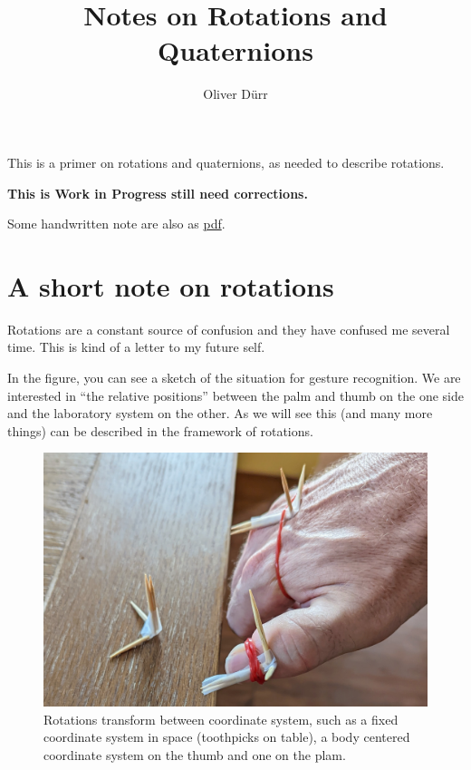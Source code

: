 \documentclass[
  letterpaper,
  DIV=11,
  numbers=noendperiod]{scrartcl}
\title{Notes on Rotations and Quaternions}
\author{Oliver Dürr}
\date{}
\renewcommand*\contentsname{Table of contents}
\newcommand\contentsname{Table of contents}
\begin{document}
\maketitle
\ifdefined\Shaded\renewenvironment{Shaded}{\begin{tcolorbox}[frame hidden, interior hidden, borderline west={3pt}{0pt}{shadecolor}, enhanced, boxrule=0pt, breakable, sharp corners]}{\end{tcolorbox}}\fi

\renewcommand*\contentsname{Table of contents}
{
\hypersetup{linkcolor=}
\setcounter{tocdepth}{3}
\tableofcontents
}
This is a primer on rotations and quaternions, as needed to describe
rotations.

\textbf{This is Work in Progress still need corrections.}

Some handwritten note are also as
\href{https://www.dropbox.com/s/n3oc5fjwrn1zaiu/Rotations\%20without\%20tears.pdf?dl=0}{pdf}.

\hypertarget{a-short-note-on-rotations}{%
\section{A short note on rotations}\label{a-short-note-on-rotations}}

Rotations are a constant source of confusion and they have confused me
several time. This is kind of a letter to my future self.

In the figure, you can see a sketch of the situation for gesture
recognition. We are interested in ``the relative positions'' between the
palm and thumb on the one side and the laboratory system on the other.
As we will see this (and many more things) can be described in the
framework of rotations.

\begin{figure}

{\centering \includegraphics[width=10.41667in,height=\textheight]{images/hand.jpg}

}

\caption{\label{fig-hand}Rotations transform between coordinate system,
such as a fixed coordinate system in space (toothpicks on table), a body
centered coordinate system on the thumb and one on the plam.}

\end{figure}
\end{document}
